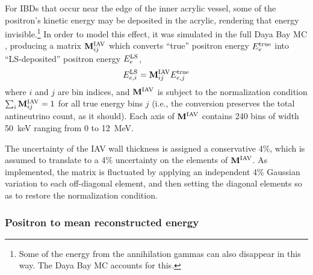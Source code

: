 \documentclass[../thesis.tex]{subfiles}
\begin{document}
For IBDs that occur near the edge of the inner acrylic vessel, some of the positron's kinetic energy may be deposited in the acrylic, rendering that energy invisible.\footnote{Some of the energy from the annihilation gammas can also disappear in this way. The Daya Bay MC accounts for this.} In order to model this effect, it was simulated in the full Daya Bay MC \cite{TruePromptSpec}, producing a matrix $\mathbf{M}^{\mathrm{IAV}}_{ij}$ which converts ``true'' positron energy $E^{\mathrm{true}}_{e}$ into ``LS-deposited'' positron energy $E^{\mathrm{LS}}_{e}$,
\begin{equation}
  \label{eq:Miav}
  E^{\mathrm{LS}}_{e,i} = \mathbf{M}^{\mathrm{IAV}}_{ij} E^{\mathrm{true}}_{e,j}
\end{equation}
where $i$ and $j$ are bin indices, and $\mathbf{M}^{\mathrm{IAV}}$ is subject to the normalization condition $\sum_i\mathbf{M}^{\mathrm{IAV}}_{ij} = 1$ for all true energy bins $j$ (i.e., the conversion preserves the total antineutrino count, as it should). Each axis of $\mathbf{M}^{\mathrm{IAV}}$ contains 240 bins of width 50~keV ranging from 0 to 12~MeV.

The uncertainty of the IAV wall thickness is assigned a conservative 4\%, which is assumed to translate to a 4\% uncertainty on the elements of $\mathbf{M}^{\mathrm{IAV}}$. As implemented, the matrix is fluctuated by applying an independent 4\% Gaussian variation to each off-diagonal element, and then setting the diagonal elements so as to restore the normalization condition.

\subsubsection{Positron to mean reconstructed energy}
\label{sec:fitEeToMeanErec}
\end{document}

